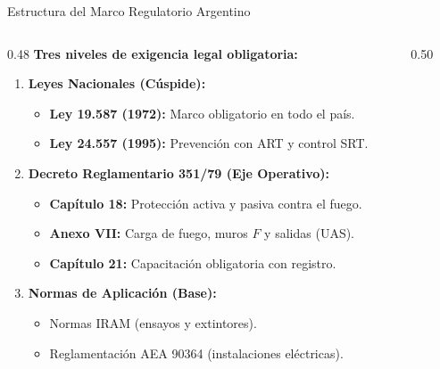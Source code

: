 \begin{frame}{Estructura del Marco Regulatorio Argentino}
  \begin{columns}[T]
    \begin{column}{0.48\textwidth}
      \normalsize
      \textbf{Tres niveles de exigencia legal obligatoria:}
      \vspace{0.08cm}
      \begin{enumerate}
        \footnotesize
        \setlength{\itemsep}{1.5pt}
        \item \textbf{Leyes Nacionales (Cúspide):}
        \begin{itemize}
          \scriptsize
          \item \textbf{Ley 19.587 (1972):} Marco obligatorio en todo el país.
          \item \textbf{Ley 24.557 (1995):} Prevención con ART y control SRT.
        \end{itemize}
        \item \textbf{Decreto Reglamentario 351/79 (Eje Operativo):}
        \begin{itemize}
          \scriptsize
          \item \textbf{Capítulo 18:} Protección activa y pasiva contra el fuego.
          \item \textbf{Anexo VII:} Carga de fuego, muros $F$ y salidas (UAS).
          \item \textbf{Capítulo 21:} Capacitación obligatoria con registro.
        \end{itemize}
        \item \textbf{Normas de Aplicación (Base):}
        \begin{itemize}
          \scriptsize
          \item Normas IRAM (ensayos y extintores).
          \item Reglamentación AEA 90364 (instalaciones eléctricas).
        \end{itemize}
      \end{enumerate}
    \end{column}

    \begin{column}{0.50\textwidth}
      \centering
\end{column}
\end{columns}
\end{frame}
